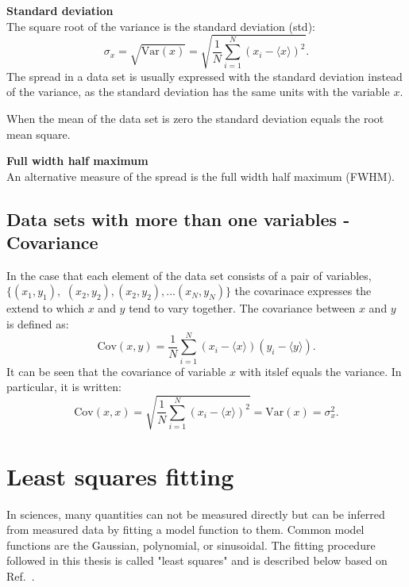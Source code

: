 \normalsize{\textbf{Standard deviation}}\\
The square root of the variance is the standard deviation (std):
\begin{equation}\label{eq:std_def}
    \sigma_x = \sqrt{\mathrm{Var}(x)} = \sqrt{\frac{1}{N} \sum_{i=1}^{N} (x_i-\langle x \rangle)^2}.
\end{equation}
The spread in a data set is usually expressed with the standard deviation instead of the variance, as the standard deviation has the same units with the variable $x$.

When the mean of the data set is zero the standard deviation equals the root mean square.

\normalsize{\textbf{Full width half maximum}}\\
An alternative measure of the spread is the full width half maximum (FWHM).


\subsection{Data sets with more than one variables - Covariance}
In the case that each element of the data set consists of a pair of variables, $\{(x_1, y_1),$ $(x_2, y_2), (x_2, y_2), ...(x_N, y_N)\}$ the covarinace expresses the extend to which $x$ and $y$ tend to vary together. The covariance between $x$ and $y$ is defined as:
\begin{equation}\label{eq:cov_def}
    \mathrm{Cov}(x, y) = \frac{1}{N} \sum_{i=1}^{N} (x_i-\langle x \rangle) (y_i-\langle y \rangle).
\end{equation}
It can be seen that the covariance of variable $x$ with itslef equals the variance. In particular, it is written:
\begin{equation}\label{eq:std_var_cov_relationship}
    \mathrm{Cov}(x, x) = \sqrt{\frac{1}{N} \sum_{i=1}^{N} (x_i-\langle x \rangle)^2} = \mathrm{Var}(x) = \sigma_x^2.
\end{equation}

\section{Least squares fitting}\label{app:non_linear_fitting}
In sciences, many quantities can not be measured directly but can be inferred from measured data by fitting a model function to them. Common model functions are the Gaussian, polynomial, or sinusoidal. The fitting procedure followed in this thesis is called "least squares" and is described below based on Ref.~\cite{least_square_minimisation}.

